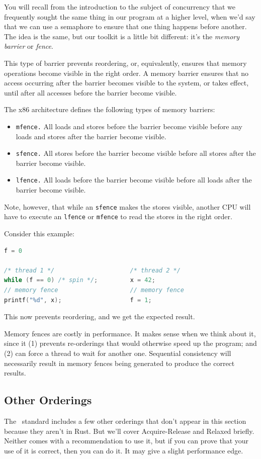 You will recall from the introduction to the subject of concurrency that we frequently sought the same thing in our program at a higher level, when we'd say that we can use a semaphore to ensure that one thing happens before another. The idea is the same, but our toolkit is a little bit different: it's the \emph{memory barrier} or
\emph{fence}. 

This type of barrier prevents reordering, or,
equivalently, ensures that memory operations become visible in the
right order. A memory barrier ensures that no access occurring after
the barrier becomes visible to the system, or takes effect, until
after all accesses before the barrier become visible.


The x86 architecture defines the following types of memory 
barriers:

\begin{itemize}
\item {\tt mfence.} All loads and stores before the barrier become
visible before any loads and stores after the barrier become visible.
\item {\tt sfence.} All stores before the barrier become visible before
all stores after the barrier become visible.
\item {\tt lfence.} All loads before the barrier become visible before
all loads after the barrier become visible.
\end{itemize}

Note, however, that while an {\tt sfence} makes the stores visible,
another CPU will have to execute an {\tt lfence} or {\tt mfence} to
read the stores in the right order.

Consider this example:
  \begin{lstlisting}[language=C]
                         f = 0

/* thread 1 */                     /* thread 2 */
while (f == 0) /* spin */;         x = 42;
// memory fence                    // memory fence
printf("%d", x);                   f = 1;
  \end{lstlisting}
This now prevents reordering, and we get the expected result.

Memory fences are costly in performance. It makes sense when we think about it, since it (1) prevents re-orderings that would otherwise speed up the program; and (2) can force a thread to wait for another one. Sequential consistency will necessarily result in memory fences being generated to produce the correct results. 

\subsection*{Other Orderings}
The \CPP~standard includes a few other orderings that don't appear in this section because they aren't in Rust. But we'll cover Acquire-Release and Relaxed briefly. Neither comes with a recommendation to use it, but if you can prove that your use of it is correct, then you can do it. It may give a slight performance edge.

